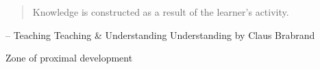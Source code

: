 \begin{frame}[standout]
  \begin{quote}
    Knowledge is constructed as a result of the learner's activity. \\[8mm]
  \end{quote}

  {\scriptsize -- Teaching Teaching \& Understanding Understanding by Claus Brabrand}

\end{frame}

\begin{frame}{Zone of proximal development}
  \vspace{4mm}
  \centering
  \begin{adjustbox}{width=0.7\columnwidth, keepaspectratio}
  \end{adjustbox}
  
\end{frame}